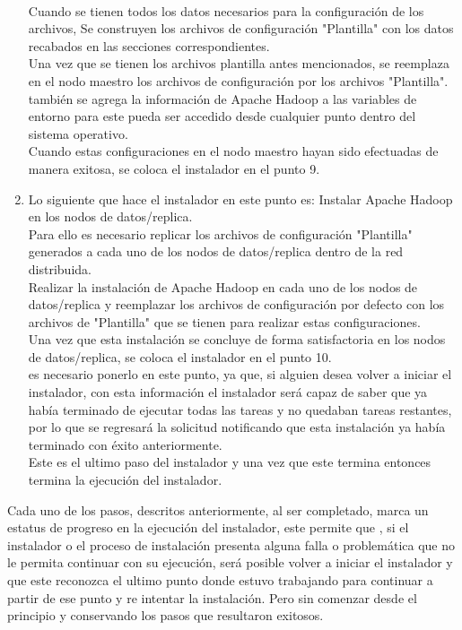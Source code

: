 \begin{enumerate}
	\\
	Cuando se tienen todos los datos necesarios para la configuración de los archivos, Se construyen los archivos de configuración "Plantilla" con los datos recabados en las secciones correspondientes.
	\\
	Una vez que se tienen los archivos plantilla antes mencionados, se reemplaza en el nodo maestro los archivos de configuración por los archivos "Plantilla".
	\\
	también se agrega la información de Apache Hadoop a las variables de entorno para este pueda ser accedido desde cualquier punto dentro del sistema operativo.\\
	Cuando estas configuraciones en el nodo maestro hayan sido efectuadas de manera exitosa, se coloca el instalador en el punto 9.
	\item Lo siguiente que hace el instalador en este punto es: Instalar Apache Hadoop en los nodos de datos/replica.\\
	Para ello es necesario replicar los archivos de configuración "Plantilla" generados a cada uno de los nodos de datos/replica dentro de la red distribuida.\\
	Realizar la instalación de Apache Hadoop en cada uno de los nodos de datos/replica y reemplazar los archivos de configuración por defecto con los archivos de "Plantilla" que se tienen para realizar estas configuraciones.
	\\
	Una vez que esta instalación se concluye de forma satisfactoria en los nodos de datos/replica, se coloca el instalador en el punto 10.\\
	es necesario ponerlo en este punto, ya que, si alguien desea volver a iniciar el instalador, con esta información el instalador será capaz de saber que ya había terminado de ejecutar todas las tareas y no quedaban tareas restantes, por lo que se regresará la solicitud notificando que esta instalación ya había terminado con éxito anteriormente.\\
	Este es el ultimo paso del instalador y una vez que este termina entonces termina la ejecución del instalador.\\ 
\end{enumerate}
Cada uno de los pasos, descritos anteriormente, al ser completado, marca un estatus de progreso en la ejecución del instalador, este permite que , si el instalador o el proceso de instalación presenta alguna falla o problemática que no le permita continuar con su ejecución, será posible volver a iniciar el instalador y que este reconozca el ultimo punto donde estuvo trabajando para continuar a partir de ese punto y re intentar la instalación. Pero sin comenzar desde el principio y conservando los pasos que resultaron exitosos.
\\
  
